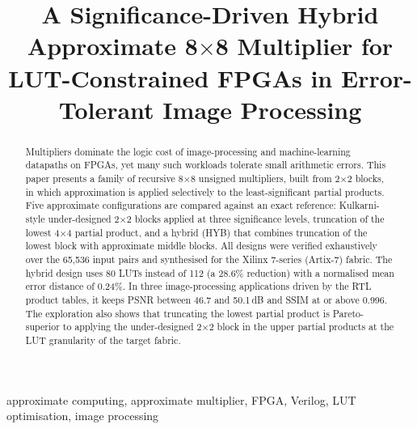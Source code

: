 \documentclass[conference]{IEEEtran}
\begin{document}
\title{A Significance-Driven Hybrid Approximate 8$\times$8 Multiplier for LUT-Constrained FPGAs in Error-Tolerant Image Processing}

\author{
\and
{}
}

\maketitle

\begin{abstract}
Multipliers dominate the logic cost of image-processing and machine-learning datapaths on FPGAs, yet many such workloads tolerate small arithmetic errors. This paper presents a family of recursive 8$\times$8 unsigned multipliers, built from 2$\times$2 blocks, in which approximation is applied selectively to the least-significant partial products. Five approximate configurations are compared against an exact reference: Kulkarni-style under-designed 2$\times$2 blocks applied at three significance levels, truncation of the lowest 4$\times$4 partial product, and a hybrid (HYB) that combines truncation of the lowest block with approximate middle blocks. All designs were verified exhaustively over the 65{,}536 input pairs and synthesised for the Xilinx 7-series (Artix-7) fabric. The hybrid design uses 80 LUTs instead of 112 (a 28.6\% reduction) with a normalised mean error distance of 0.24\%. In three image-processing applications driven by the RTL product tables, it keeps PSNR between 46.7 and 50.1\,dB and SSIM at or above 0.996. The exploration also shows that truncating the lowest partial product is Pareto-superior to applying the under-designed 2$\times$2 block in the upper partial products at the LUT granularity of the target fabric.
\end{abstract}

\begin{IEEEkeywords}
approximate computing, approximate multiplier, FPGA, Verilog, LUT optimisation, image processing
\end{IEEEkeywords}
\end{document}
